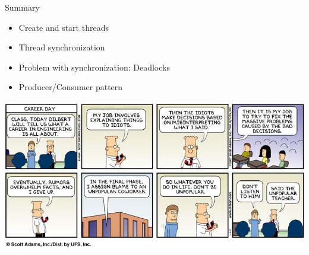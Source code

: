 \begin{frame}{Summary}
  \begin{itemize}
  \item Create and start threads
  \item Thread synchronization
  \item Problem with synchronization: Deadlocks
  \item Producer/Consumer pattern
  \end{itemize}


  \begin{center}
    \includegraphics[width=\textwidth]{figures/dilbert-3}    
  \end{center}
\end{frame}


